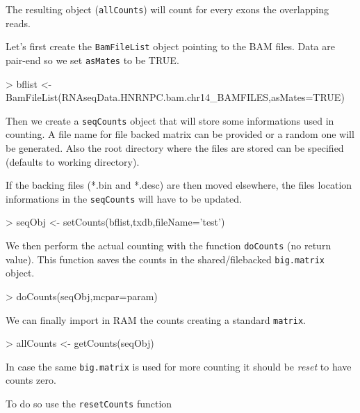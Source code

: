 \documentclass[10pt]{article}
\newcommand{\Rfunction}[1]{{\texttt{#1}}}
\newcommand{\Robject}[1]{{\texttt{#1}}}
\begin{document}
The resulting object (\Robject{allCounts}) will count for every exons the
overlapping reads.

Let's first create the \Robject{BamFileList} object pointing to the BAM
files. Data are pair-end so we set \Robject{asMates} to be TRUE.

\begin{Schunk}
\begin{Sinput}
> bflist <- BamFileList(RNAseqData.HNRNPC.bam.chr14_BAMFILES,asMates=TRUE)
\end{Sinput}
\end{Schunk}

Then we create a \Robject{seqCounts} object that will store some informations
used in counting.  A file name for file backed matrix can be provided or a
random one will be generated. Also the root directory where the files are stored
can be specified (defaults to working directory).

If the backing files (*.bin and *.desc) are then moved elsewhere, the files
location informations in the \Robject{seqCounts} will have to be updated.


\begin{Schunk}
\begin{Sinput}
> seqObj <- setCounts(bflist,txdb,fileName='test')
\end{Sinput}
\end{Schunk}


We then perform the actual counting with the function \Robject{doCounts} (no
return value). This function saves the counts in the shared/filebacked \Robject{big.matrix}
object.

\begin{Schunk}
\begin{Sinput}
> doCounts(seqObj,mcpar=param)
\end{Sinput}
\end{Schunk}

We can finally import in RAM the counts creating a standard \Robject{matrix}.

\begin{Schunk}
\begin{Sinput}
> allCounts <- getCounts(seqObj)
\end{Sinput}
\end{Schunk}

In case the same \Robject{big.matrix} is used for more counting it should be
\textit{reset} to have counts zero.

To do so use the \Rfunction{resetCounts} function
\end{document}
